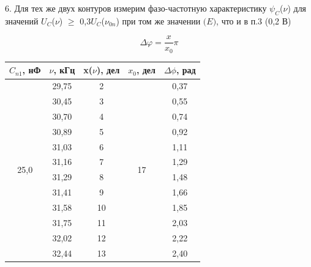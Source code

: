 \documentclass[a4paper,12pt]{article}
\begin{document}
6. Для тех же двух контуров измерим фазо-частотную характеристику $\psi_C$($\nu$) для значений $U_C$($\nu$) $\geq$ 0,3$U_C$($\nu_{0n}$) при том же значении $\mathcal(E)$, что и в п.3 (0,2 В) 

$$\Delta\varphi = \frac x{x_0}\pi$$

\begin{tabular}{|c|c|c|c|c|}
\hline
$C_{n1}$, нФ & $\nu$, кГц & x($\nu$), дел & $x_0$, дел & $\Delta$$\phi$, рад\\
\hline
\multirow{12}{*}{25,0} & 29,75 & 2 & \multirow{12}{*}{17} & 0,37\\
\cline{2-3} & 30,45 & 3 & & 0,55\\
\cline{2-3} & 30,70 & 4 & & 0,74\\
\cline{2-3} & 30,89 & 5 & & 0,92\\
\cline{2-3} & 31,03 & 6 & & 1,11\\
\cline{2-3} & 31,16 & 7 & & 1,29\\
\cline{2-3} & 31,29 & 8 & & 1,48\\
\cline{2-3} & 31,41 & 9 & & 1,66\\
\cline{2-3} & 31,58 & 10 & & 1,85\\
\cline{2-3} & 31,75 & 11 & & 2,03\\
\cline{2-3} & 32,02 & 12 & & 2,22\\
\cline{2-3} & 32,44 & 13 & & 2,40\\
\hline
\end{tabular}
\qquad
\end{document}
